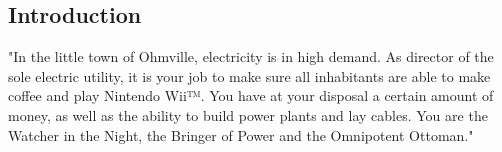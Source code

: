 \subsection{Introduction}
"In the little town of Ohmville, electricity is in high demand. As director of the sole electric 
utility, it is your job to make sure all inhabitants are able to make coffee and play Nintendo Wii™. 
You have at your disposal a certain amount of money, as well as the ability to build power plants 
and lay cables. You are the Watcher in the Night, the Bringer of Power and the Omnipotent Ottoman."